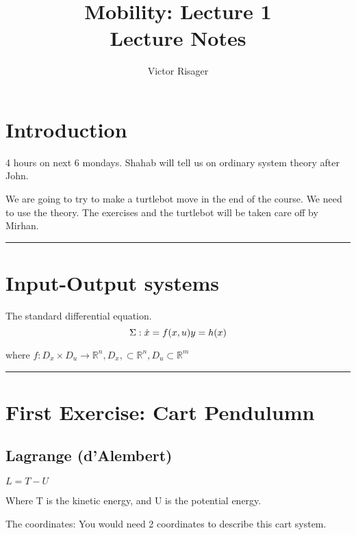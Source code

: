 \documentclass[a4paper]{article}
\title{Mobility: Lecture 1 \\
	\large Lecture Notes}
\author{Victor Risager}
\newcommand{\incfig}[2][1]{%
    \def\svgwidth{#1\columnwidth}
    {#2.pdf_tex}
}
\begin{document}
\maketitle

\section{Introduction}
4 hours on next 6 mondays. 
Shahab will tell us on ordinary system theory after John.

We are going to try to make a turtlebot move in the end of the course. We need to use the theory. 
The exercises and the turtlebot will be taken care off by Mirhan.


\vspace{5pt}
\hrule
\vspace{5pt}
\section{Input-Output systems}
The standard differential equation. 
 \[
\Sigma: 
\dot{x} = f(x,u) \newline
y = h(x)
\] 


where $f: D_x \times D_u \rightarrow \mathbb{R}^n, D_x,  \subset \mathbb{R}^n, D_u \subset \mathbb{R}^m$




\vspace{5pt}
\hrule
\vspace{5pt}
\section{First Exercise: Cart Pendulumn}




\subsection{Lagrange (d'Alembert)}
$L = T - U$

Where T is the kinetic energy, and U is the potential energy.

The coordinates:
You would need 2 coordinates to describe this cart system.
\end{document}
